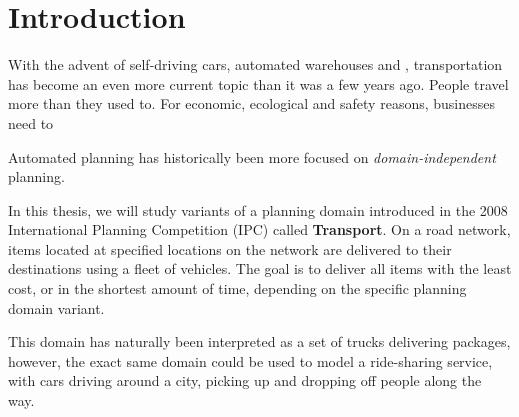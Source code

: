 \chapter*{Introduction}

With the advent of self-driving cars, automated warehouses and ,
transportation has become an even more current topic than it was a few years ago.
People travel more than they used to. For economic, ecological and safety reasons, businesses need to

Automated planning has historically been more focused on
\textit{domain-independent} planning. 


In this thesis, we will study variants of a planning domain introduced in the 2008 International Planning Competition (IPC)
called \textbf{Transport}. On a road network, items located at specified locations on the network are delivered to their destinations
using a fleet of vehicles. The goal is to deliver all items
with the least cost, or in the shortest amount of time, depending on the
specific planning domain variant.



This domain has naturally been interpreted as a set of trucks
delivering packages, however, the exact same domain could be used to
model a ride-sharing service, with cars driving around a city, picking up and dropping off people along the way.









